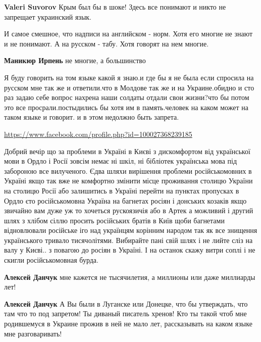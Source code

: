 \begin{itemize}
{

\textbf{Valeri Suvorov} Крым был бы в шоке! Здесь все понимают и никто не
запрещает украинский язык.


И самое смешное, что надписи на английском - норм. Хотя его многие не знают и
не понимают. А на русском - табу. Хотя говорят на нем многие.

\textbf{Маникюр Ирпень} не многие, а большинство


Я буду говорить на том языке какой я знаю.и где бы я не была если спросила на
русском мне так же и ответили.что в Молдове так же и на Украине.обидно и сто
раз задаю себе вопрос нахрена наши солдаты отдали свои жизни?что бы потом это
все просрали.постыдились бы хотя им в память.человек на каком может на таком
языке и говорит. и в этом недолжно быть запрета.

\url{https://www.facebook.com/profile.php?id=100027368239185}

Добрий вечір що за проблеми в Україні в Києві з дискомфортом від української
мови в Ордло і Росії зовсім немає ні шкіл, ні бібліотек українська мова під
забороною все вилученого. Єдва шляхи вирішення проблеми російськомовних в
Україні якщо так вже не комфортно змінити місце проживання столицю України на
столицю Росії або залишитись в Україні перейти на пунктах пропусках в Ордло єто
російськомовна Україна на багнетах росіян і донських козаків якщо звичайно вам
дуже уж то хочеться рускоязичія або в Артек а можливий і другий шлях з хлібом
сіллю просить російських братів в Київ щоби багнетами відновлювали російське
іго над українцям корінним народом так як все знищення українського тривало
тисячолітями. Вибирайте пані свій шлях і не лийте сліз на валу у Києві.. з
повагою до росіян в Україні. І на останок скажу витри соплі і не скигли
російськомовная бурда.

\begin{itemize}

\textbf{Алексей Данчук} мне кажется не тысячилетия, а миллионы или даже миллиарды лет!

\textbf{Алексей Данчук} А Вы были в Луганске или Донецке, что бы утверждать,
что там что то под запретом! Ты диваный писатель хренов! Кто ты такой чтоб мне
родившемуся в Украине прожив в ней не мало лет, рассказывать на каком языке мне
разговаривать!


\end{itemize}}
\end{itemize}
